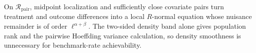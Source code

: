 On \(\mathcal R_{\mathrm{pair}}\), midpoint localization and sufficiently close covariate pairs turn treatment and outcome differences into a local \(R\)-normal equation whose nuisance remainder is of order \(\ell^{\alpha+\beta}\).  The two-sided density band alone gives population rank and the pairwise Hoeffding variance calculation, so density smoothness is unnecessary for benchmark-rate achievability.